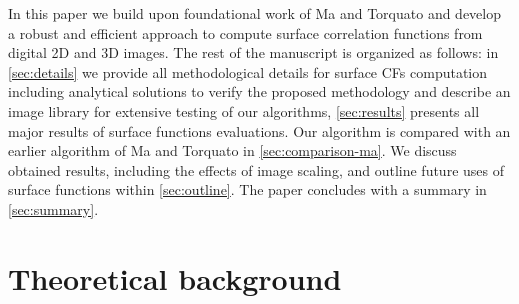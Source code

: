 \documentclass[reprint,amsmath,amssymb,aps,pre,showkeys,showpacs]{revtex4-1}
\begin{document}
In this paper we build upon foundational work of Ma and Torquato \cite{ma2018SS}
and develop a robust and efficient approach to compute surface correlation
functions from digital 2D and 3D images. The rest of the manuscript is organized
as follows: in \cref{sec:details} we provide all methodological details for
surface CFs computation including analytical solutions to verify the proposed
methodology and describe an image library for extensive testing of our
algorithms, \cref{sec:results} presents all major results of surface functions
evaluations. Our algorithm is compared with an earlier algorithm of Ma and
Torquato in \cref{sec:comparison-ma}. We discuss obtained results, including the
effects of image scaling, and outline future uses of surface functions within
\cref{sec:outline}. The paper concludes with a summary in \cref{sec:summary}.

\section{Theoretical background}
\label{sec:theory}
\end{document}
